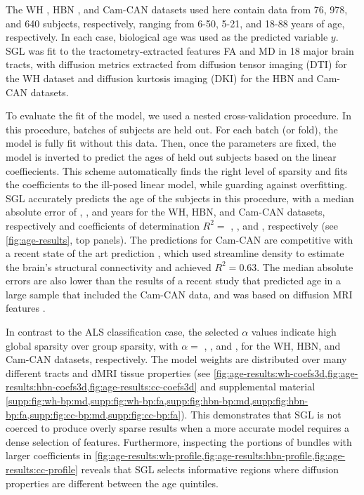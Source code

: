 \documentclass[10pt,%
               aps,%
               prl,%
               preprint,%
               superscriptaddress,%
               preprintnumbers,%
               amsmath,%
               floatfix,%
               endfloats*]{revtex4-1}
\begin{document}
The WH \cite{yeatman2014lifespan}, HBN \cite{alexander2017open}, and Cam-CAN
\cite{shafto2014cambridge,taylor2017cambridge} datasets used here contain
data from 76, 978, and 640 subjects, respectively, ranging from 6-50, 5-21,
and 18-88 years of age, respectively. In each case, biological age was used
as the predicted variable $y$. SGL was fit to the tractometry-extracted
features FA and MD in 18 major brain tracts, with diffusion metrics extracted
from diffusion tensor imaging (DTI) for the WH dataset and diffusion kurtosis
imaging (DKI) \cite{jensen2005diffusion} for the HBN and Cam-CAN datasets.

To evaluate the fit of the model, we used a nested cross-validation
procedure. In this procedure, batches of subjects are held out. For each
batch (or fold), the model is fully fit without this data. Then, once the
parameters are fixed, the model is inverted to predict the ages of held out
subjects based on the linear coeffiecients. This scheme automatically finds
the right level of sparsity and fits the coefficients to the ill-posed linear
model, while guarding against overfitting. SGL accurately predicts the age of
the subjects in this procedure, with a median absolute error of {\whMae},
{\hbnMae}, and {\camcanMae} years for the WH, HBN, and Cam-CAN datasets,
respectively and coefficients of determination $R^2 = $ {\whRsq} , {\hbnRsq},
and {\camcanRsq}, respectively (see \cref{fig:age-results}, top panels). The
predictions for Cam-CAN are competitive with a recent state of the art
prediction \cite{mcpherson2020single}, which used streamline density to
estimate the brain's structural connectivity and achieved $R^2 = 0.63$. The
median absolute errors are also lower than the results of a recent study that
predicted age in a large sample that included the Cam-CAN data, and was based
on diffusion MRI features \cite{Richard2018-ux}.

In contrast to the ALS classification case, the selected $\alpha$ values
indicate high global sparsity over group sparsity, with $\alpha = $
{\whLRatio}, {\hbnLRatio}, and {\ccLRatio}, for the WH, HBN, and Cam-CAN
datasets, respectively. The model weights are distributed over many different
tracts and dMRI tissue properties (see
\cref{fig:age-results:wh-coefs3d,fig:age-results:hbn-coefs3d,fig:age-results:cc-coefs3d}
and supplemental material
\cref{supp:fig:wh-bp:md,supp:fig:wh-bp:fa,supp:fig:hbn-bp:md,supp:fig:hbn-bp:fa,supp:fig:cc-bp:md,supp:fig:cc-bp:fa}).
This demonstrates that SGL is not coerced to produce overly sparse results
when a more accurate model requires a dense selection of features.
Furthermore, inspecting the portions of bundles with larger coefficients in
\cref{fig:age-results:wh-profile,fig:age-results:hbn-profile,fig:age-results:cc-profile}
reveals that SGL selects informative regions where diffusion properties are
different between the age quintiles.
\end{document}
